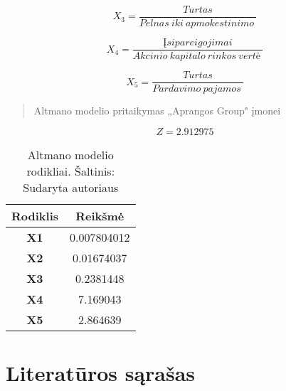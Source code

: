 \documentclass[titlepage, 11pt]{article}
\begin{document}
\begin{equation}
X_3 = \frac{Turtas}{Pelnas \ iki \ apmokestinimo \ }
\end{equation}

\begin{equation}
X_4 = \frac{ Įsipareigojimai}{Akcinio \ kapitalo \ rinkos \ vertė \ }
\end{equation}

\begin{equation}
X_5 = \frac{Turtas}{Pardavimo \ pajamos \ }
\end{equation}

\begin{quote}
\center
Altmano modelio pritaikymas „Aprangos Group" įmonei
\end{quote}

\begin{equation}
Z =2.912975
\end{equation}

\begin{table}[H]
\captionsetup{justification=centering}
\centering
\begin{tabular}{|c|c|}
\hline
\textbf{Rodiklis} & \textbf{Reikšmė} \\ \hline
\textbf{X1}       & 0.007804012      \\ \hline
\textbf{X2}       & 0.01674037       \\ \hline
\textbf{X3}       & 0.2381448        \\ \hline
\textbf{X4}       & 7.169043         \\ \hline
\textbf{X5}       & 2.864639         \\ \hline
\end{tabular}
\caption{Altmano modelio rodikliai.
Šaltinis: Sudaryta autoriaus}
\end{table}

\section{Literatūros sąrašas}
\nocite{*}
\printbibliography[title={Naudota literatūra}]
\end{document}
